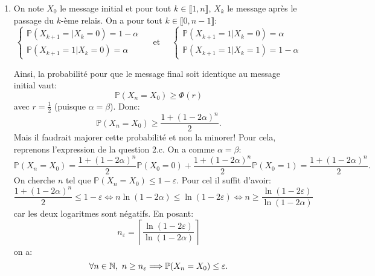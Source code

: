 \begin{enumerate}
\begin{enumerate}
 \end{enumerate}

 
 \item On note $X_{0}$ le message initial et pour tout $k\in \llbracket 1, n\rrbracket$, $X_{k}$ le message après le passage du $k$-ème relais. On a pour tout $k\in \llbracket 0, n-1\rrbracket$:
\[ \left \{ \begin{array}{ll}
             \mathbb{P}(X_{k+1} = |X_{k} = 0) = 1-\alpha\\
             \mathbb{P}(X_{k+1} = 1|X_{k} = 0) = \alpha
            \end{array}
    \right. \quad \text{ et } \quad \left \{ \begin{array}{ll}
                                              \mathbb{P}(X_{k+1} = 1|X_{k} = 0) = \alpha\\
                                              \mathbb{P}(X_{k+1} = 1|X_{k} = 1) = 1-\alpha
                                             \end{array}
                                     \right. \]

Ainsi,  la probabilité pour que le message final soit identique au message initial vaut:
\[ \mathbb{P}(X_{n} = X_{0}) \geq \Phi(r)\]
avec $r = \displaystyle{\frac{1}{2}}$ (puisque $\alpha  = \beta$). Donc:
\[ \mathbb{P}(X_{n} = X_{0}) \geq \frac{1+(1-2\alpha)^{n}}{2}.\]
Mais il faudrait majorer cette probabilité et non la minorer! Pour cela, reprenons l'expression de la question 2.c. On a comme $\alpha = \beta$:
\[ \mathbb{P}(X_{n} = X_{0}) = \frac{1+(1-2\alpha)^{n}}{2}\mathbb{P}(X_{0} = 0) + \frac{1+(1-2\alpha)^{n}}{2}\mathbb{P}(X_{0} = 1) = \frac{1+(1-2\alpha)^{n}}{2}.\]
On cherche $n$ tel que $\mathbb{P}(X_{n} = X_{0}) \leq 1- \varepsilon$. Pour cel il suffit d'avoir:
\begin{displaymath}
\frac{1+(1-2\alpha)^{n}}{2}\leq 1-\varepsilon
\Leftrightarrow n\ln (1-2\alpha) \leq \ln (1-2\varepsilon) 
\Leftrightarrow n \geq \frac{\ln (1-2\varepsilon)}{\ln (1-2\alpha)} 
\end{displaymath}
car les deux logaritmes sont négatifs. En posant:
\begin{displaymath}
 n_{\varepsilon} = \left \lceil \frac{\ln (1-2\varepsilon)}{\ln (1-2\alpha)} \right \rceil
\end{displaymath}
on a:
\[ \forall n\in \mathbb{N},\ n\geq n_{\varepsilon} \Longrightarrow \mathbb{P}(X_{n} = X_{0}) \leq \varepsilon.\]
\end{enumerate}
 
